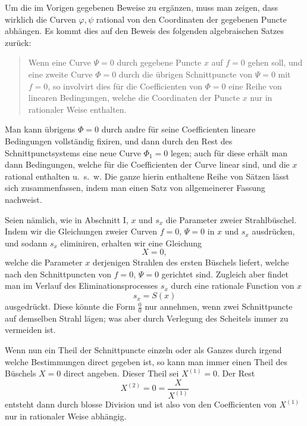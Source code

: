 \documentclass[10pt]{article}
\begin{document}
Um die im Vorigen gegebenen Beweise zu ergänzen, muss man zeigen, dass wirklich die Curven \(\varphi,\psi\) rational von den Coordinaten der gegebenen Puncte abhängen. Es kommt dies auf den Beweis des folgenden algebraischen Satzes zurück:

\begin{quote}
Wenn eine Curve \(\Psi=0\) durch gegebene Puncte \(x\) auf \(f=0\) gehen soll, und eine zweite Curve \(\Phi=0\) durch die übrigen Schnittpuncte von \(\Psi=0\) mit \(f=0\), so involvirt dies für die Coefficienten von \(\Phi=0\) eine Reihe von linearen Bedingungen, welche die Coordinaten der Puncte \(x\) nur in rationaler Weise enthalten.
\end{quote}

Man kann übrigens \(\Phi=0\) durch andre für seine Coefficienten lineare Bedingungen vollständig fixiren, und dann durch den Rest des Schnittpunctsystems eine neue Curve \(\Phi_1=0\) legen; auch für diese erhält man dann Bedingungen, welche für die Coefficienten der Curve linear sind, und die \(x\) rational enthalten u.~s.~w. Die ganze hierin enthaltene Reihe von Sätzen lässt sich zusammenfassen, indem man einen Satz von allgemeinerer Fassung nachweist.

Seien nämlich, wie in Abschnitt I, \(x\) und \(s_x\) die Parameter zweier Strahlbüschel. Indem wir die Gleichungen zweier Curven \(f=0\), \(\Psi=0\) in \(x\) und \(s_x\) ausdrücken, und sodann \(s_x\) eliminiren, erhalten wir eine Gleichung
\[
X=0,
\]
welche die Parameter \(x\) derjenigen Strahlen des ersten Büschels liefert, welche nach den Schnittpuncten von \(f=0\), \(\Psi=0\) gerichtet sind. Zugleich aber findet man im Verlauf des Eliminationsprocesses \(s_x\) durch eine rationale Function von \(x\)
\[
s_x=S(x)
\]
ausgedrückt. Diese könnte die Form \(\frac{0}{0}\) nur annehmen, wenn zwei Schnittpuncte auf demselben Strahl lägen; was aber durch Verlegung des Scheitels immer zu vermeiden ist.

Wenn nun ein Theil der Schnittpuncte einzeln oder als Ganzes durch irgend welche Bestimmungen direct gegeben ist, so kann man immer einen Theil des Büschels \(X=0\) direct angeben. Dieser Theil sei \(X^{(1)}=0\). Der Rest
\[
X^{(2)}=0=\frac{X}{X^{(1)}}
\]
entsteht dann durch blosse Division und ist also von den Coefficienten von \(X^{(1)}\) nur in rationaler Weise abhängig.
\end{document}
